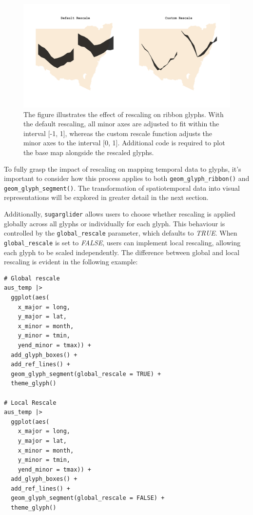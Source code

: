 \begin{figure}

{\centering \includegraphics[width=1\linewidth]{figures/custom_rescale} 

}

\caption{The figure illustrates the effect of rescaling on ribbon glyphs. With the default rescaling, all minor axes are adjusted to fit within the interval [-1, 1], whereas the custom rescale function adjusts the minor axes to the interval [0, 1]. Additional code is required to plot the base map alongside the rescaled glyphs.}\label{fig:defaultRescale}
\end{figure}

To fully grasp the impact of rescaling on mapping temporal data to glyphs, it's important to consider how this process applies to both \texttt{geom\_glyph\_ribbon()} and \texttt{geom\_glyph\_segment()}. The transformation of spatiotemporal data into visual representations will be explored in greater detail in the next section.

Additionally, \texttt{sugarglider} allows users to choose whether rescaling is applied globally across all glyphs or individually for each glyph. This behaviour is controlled by the \texttt{global\_rescale} parameter, which defaults to \emph{TRUE}. When \texttt{global\_rescale} is set to \emph{FALSE}, users can implement local rescaling, allowing each glyph to be scaled independently. The difference between global and local rescaling is evident in the following example:

\begin{verbatim}
# Global rescale
aus_temp |>
  ggplot(aes(
    x_major = long, 
    y_major = lat, 
    x_minor = month, 
    y_minor = tmin, 
    yend_minor = tmax)) +
  add_glyph_boxes() +
  add_ref_lines() +
  geom_glyph_segment(global_rescale = TRUE) +
  theme_glyph()

# Local Rescale
aus_temp |>
  ggplot(aes(
    x_major = long, 
    y_major = lat, 
    x_minor = month, 
    y_minor = tmin, 
    yend_minor = tmax)) +
  add_glyph_boxes() +
  add_ref_lines() +
  geom_glyph_segment(global_rescale = FALSE) +
  theme_glyph()
\end{verbatim}

